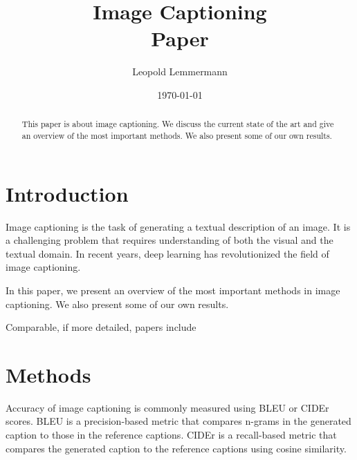 \documentclass[12pt]{article}
\newcommand{\trauthor}{Leopold Lemmermann}
\newcommand{\trtype}{Paper}
\newcommand{\trtitle}{Image Captioning}
\newcommand{\trdate}{\today}
\theoremstyle{plain}
\theoremstyle{definition}
\theoremstyle{remark}
\begin{document}
\renewcommand{\headheight}{14.5pt}

\fancyhead{}
\fancyhead[CO]{\trtitle}



\title{\trtitle\\[0.3cm]{\normalsize\trtype}}
\author{\trauthor}
\date{\trdate}
\maketitle

\thispagestyle{empty}

\begin{abstract}
  This paper is about image captioning. We discuss the current state of the art and give an overview of the most important methods. We also present some of our own results.
\end{abstract}

\tableofcontents
\newpage
{}



\section{Introduction}
\label{sec:introduction}

Image captioning is the task of generating a textual description of an image. It is a challenging problem that requires understanding of both the visual and the textual domain. In recent years, deep learning has revolutionized the field of image captioning.

In this paper, we present an overview of the most important methods in image captioning. We also present some of our own results.

Comparable, if more detailed, papers include %

\section{Methods}
\label{sec:methods}

Accuracy of image captioning is commonly measured using BLEU or CIDEr scores. BLEU is a precision-based metric that compares n-grams in the generated caption to those in the reference captions. CIDEr is a recall-based metric that compares the generated caption to the reference captions using cosine similarity.
\end{document}
